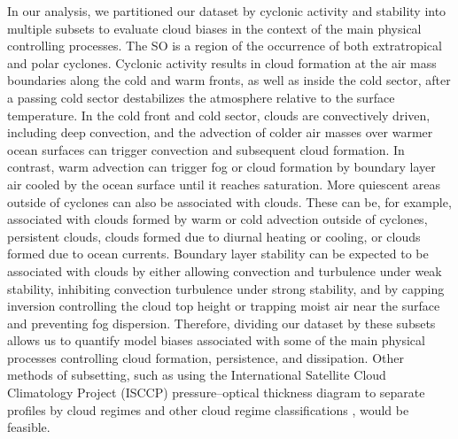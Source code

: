 \documentclass[draft]{agujournal2019}
\begin{document}
In our analysis, we partitioned our dataset by cyclonic activity and stability into multiple subsets to evaluate cloud biases in the context of the main physical controlling processes. The SO is a region of the occurrence of both extratropical and polar cyclones. Cyclonic activity results in cloud formation at the air mass boundaries along the cold and warm fronts, as well as inside the cold sector, after a passing cold sector destabilizes the atmosphere relative to the surface temperature. In the cold front and cold sector, clouds are convectively driven, including deep convection, and the advection of colder air masses over warmer ocean surfaces can trigger convection and subsequent cloud formation. In contrast, warm advection can trigger fog or cloud formation by boundary layer air cooled by the ocean surface until it reaches saturation. More quiescent areas outside of cyclones can also be associated with clouds. These can be, for example, associated with clouds formed by warm or cold advection outside of cyclones, persistent clouds, clouds formed due to diurnal heating or cooling, or clouds formed due to ocean currents. Boundary layer stability can be expected to be associated with clouds by either allowing convection and turbulence under weak stability, inhibiting convection turbulence under strong stability, and by capping inversion controlling the cloud top height or trapping moist air near the surface and preventing fog dispersion. Therefore, dividing our dataset by these subsets allows us to quantify model biases associated with some of the main physical processes controlling cloud formation, persistence, and dissipation. Other methods of subsetting, such as using the International Satellite Cloud Climatology Project (ISCCP) pressure–optical thickness diagram \cite{rossow1991,rossow1999,hahn2001} to separate profiles by cloud regimes and other cloud regime classifications \cite{oreopoulos2016,schuddeboom2018}, would be feasible.
\end{document}
